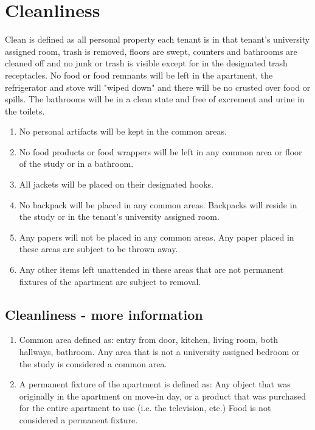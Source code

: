 \documentclass[10pt]{article}
\begin{document}
\section{Cleanliness}
Clean is defined as all personal property each tenant is in that tenant’s university assigned room, trash is removed, floors are swept, counters and bathrooms are cleaned off and no junk or trash is visible except for in the designated trash receptacles. No food or food remnants will be left in the apartment, the refrigerator and stove will "wiped down" and there will be no crusted over food or spills. The bathrooms will be in a clean state and free of excrement and urine in the toilets.
\begin{enumerate}
	\item No personal artifacts will be kept in the common areas.
	\item No food products or food wrappers will be left in any common area or floor of the study or in a bathroom.
	\item All jackets will be placed on their designated hooks.
	\item No backpack will be placed in any common areas. Backpacks will reside in the study or in the tenant’s university assigned room.
	\item Any papers will not be placed in any common areas. Any paper placed in these areas are subject to be thrown away.
	\item Any other items left unattended in these areas that are not permanent fixtures of the apartment are subject to removal.
	
\end{enumerate}
\subsection{Cleanliness - more information}
\begin{enumerate}
	\item Common area defined as: entry from door, kitchen, living room, both hallways, bathroom. Any area that is not a university assigned bedroom or the study is considered a common area.
	\item A permanent fixture of the apartment is defined as: Any object that was originally in the apartment on move-in day, or a product that was purchased for the entire apartment to use (i.e. the television, etc.)
	\subitem Food is not considered a permanent fixture.
\end{enumerate}
\end{document}
